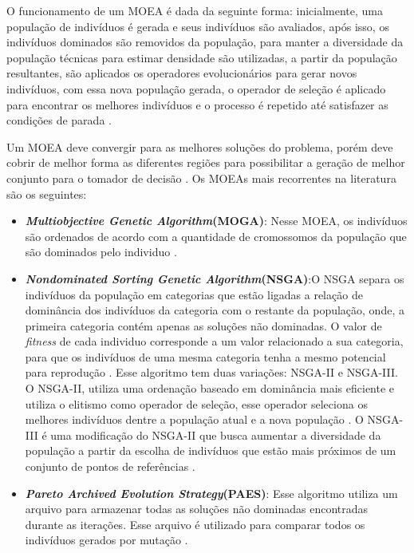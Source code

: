  O funcionamento de um MOEA é dada da seguinte forma: inicialmente, uma população de indivíduos é gerada e seus indivíduos são avaliados, após isso, os indivíduos dominados são removidos da população, para  manter a diversidade da população técnicas para estimar densidade são utilizadas, a partir da população resultantes, são aplicados os operadores evolucionários para gerar novos indivíduos, com essa nova população gerada, o operador de seleção é aplicado para encontrar os melhores indivíduos e o processo é repetido até satisfazer as condições de parada \cite{coello2007evolutionary}.
 
Um MOEA deve convergir para as melhores soluções do problema, porém deve cobrir de melhor forma as diferentes regiões para possibilitar a geração de melhor conjunto para o tomador de decisão \cite{carvalho2013novas}. Os MOEAs mais recorrentes na literatura são os seguintes:
\begin{itemize}
    \item \textbf{\textit{Multiobjective Genetic Algorithm}(MOGA)}: Nesse MOEA, os indivíduos são ordenados de acordo com a quantidade de cromossomos da população que são dominados pelo individuo \cite{coello2007evolutionary}. 
    \item \textbf{\textit{Nondominated Sorting Genetic Algorithm}(NSGA)}:O NSGA separa os indivíduos da população em categorias que estão ligadas a relação de dominância dos indivíduos da categoria com o restante da população, onde, a primeira categoria contém apenas as soluções não dominadas. O valor de \textit{fitness} de cada individuo corresponde a um valor relacionado a sua categoria, para que os indivíduos de uma mesma categoria tenha a mesmo potencial para reprodução \cite{coello2007evolutionary}. Esse algoritmo tem duas variações: NSGA-II e NSGA-III. O NSGA-II, utiliza uma ordenação baseado em dominância mais eficiente e utiliza o elitismo como operador de seleção, esse operador seleciona os melhores indivíduos dentre a população atual e a nova população \cite{deb2002fast}. O NSGA-III é uma modificação do NSGA-II que busca aumentar a diversidade da população a partir da escolha de indivíduos que estão mais próximos de um conjunto de pontos de referências \cite{deb2013evolutionary}.
    \item \textbf{\textit{Pareto Archived Evolution Strategy}(PAES)}: Esse algoritmo utiliza um arquivo para armazenar todas as soluções não dominadas encontradas durante as iterações. Esse arquivo é utilizado para comparar todos os indivíduos gerados por mutação \cite{coello2007evolutionary}.
\end{itemize}

